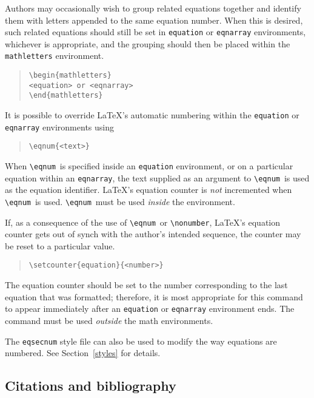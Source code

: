 \documentclass[preprint2]{aastex}
\begin{document}
Authors may occasionally wish to group related equations together and 
identify them with letters appended to the same equation number. 
When this is desired, such related equations should still be set 
in \texttt{equation} or \texttt{eqnarray} environments, whichever is 
appropriate, and the grouping should then be placed within 
the \texttt{mathletters} environment. 
\begin{quote} 
\begin{verbatim} 
\begin{mathletters} 
<equation> or <eqnarray> 
\end{mathletters} 
\end{verbatim} 
\end{quote} 
 
It is possible to override \LaTeX's automatic numbering within the 
\texttt{equation} or \texttt{eqnarray} environments using 
\begin{quote} 
\begin{verbatim} 
\eqnum{<text>} 
\end{verbatim} 
\end{quote} 
When \verb"\eqnum"\ 
 is specified inside an \texttt{equation} environment, 
or on a particular equation within an \texttt{eqnarray}, the text 
supplied as an argument to \verb"\eqnum"\ 
 is used as the equation 
identifier. 
\LaTeX's equation counter is \emph{not} incremented when \verb"\eqnum"\ 
 is used. 
\verb"\eqnum"\ 
 must be used \emph{inside} the environment. 
 
If, as a consequence of the use of \verb"\eqnum"\ 
 or \verb"\nonumber", 
\LaTeX's equation counter gets out of synch with the author's 
intended sequence, 
the counter may be reset to a particular value. 
\begin{quote} 
\begin{verbatim} 
\setcounter{equation}{<number>} 
\end{verbatim} 
\end{quote} 
The equation counter should be set to the number corresponding to the 
last equation that was formatted; therefore, it is most appropriate for this 
command to appear immediately after an \texttt{equation} or 
\texttt{eqnarray} environment 
ends. 
The command must be used 
\emph{outside} the math environments. 
 
The \texttt{eqsecnum} style file can also be used to modify the way equations 
are numbered. See Section~\ref{styles} for details. 
 
 
\subsection{Citations and bibliography}   \label{bibliography} 
 
\end{document}
